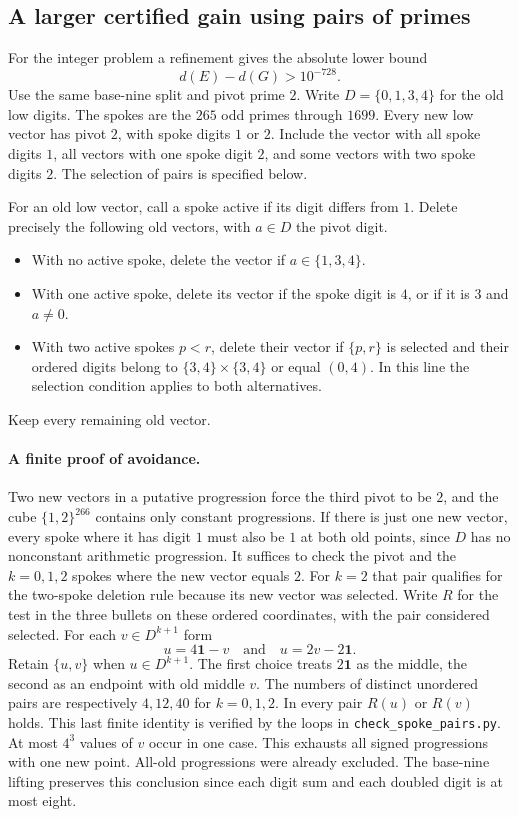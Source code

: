 \subsection*{A larger certified gain using pairs of primes}

For the integer problem a refinement gives the absolute lower bound
\[
                         d(E)-d(G)>10^{-728}.
\]
Use the same base-nine split and pivot prime $2$. Write $D=\{0,1,3,4\}$
for the old low digits. The spokes are the $265$ odd primes through
$1699$. Every new low vector has pivot $2$, with spoke digits $1$ or
$2$. Include the vector with all spoke digits $1$, all vectors with
one spoke digit $2$, and some vectors with two spoke digits $2$. The
selection of pairs is specified below.

For an old low vector, call a spoke active if its digit differs from
$1$. Delete precisely the following old vectors, with $a\in D$ the
pivot digit.
\begin{itemize}
\item With no active spoke, delete the vector if $a\in\{1,3,4\}$.
\item With one active spoke, delete its vector if the spoke digit
is $4$, or if it is $3$ and $a\ne0$.
\item With two active spokes $p<r$, delete their vector if $\{p,r\}$
is selected and their ordered digits belong to
$\{3,4\}\times\{3,4\}$ or equal $(0,4)$. In this line the selection
condition applies to both alternatives.
\end{itemize}
Keep every remaining old vector.

\paragraph{A finite proof of avoidance.}
Two new vectors in a putative progression force the third pivot to be
$2$, and the cube $\{1,2\}^{266}$ contains only constant progressions.
If there is just one new vector, every spoke where it has digit $1$ must
also be $1$ at both old points, since $D$ has no nonconstant arithmetic
progression. It suffices to check the pivot and the $k=0,1,2$ spokes
where the new vector equals $2$. For $k=2$ that pair qualifies for the
two-spoke deletion rule because its new vector was selected. Write $R$
for the test in the three bullets on these ordered coordinates, with
the pair considered selected. For each $v\in D^{k+1}$ form
\[
                  u=4\mathbf{1}-v
             \quad\text{and}\quad
                  u=2v-2\mathbf{1}.
\]
Retain $\{u,v\}$ when $u\in D^{k+1}$. The first choice treats
$2\mathbf{1}$ as the middle, the second as an endpoint with old
middle $v$. The numbers of distinct unordered pairs are respectively
$4,12,40$ for $k=0,1,2$. In every pair $R(u)$ or $R(v)$ holds.
This last finite identity is verified by the loops in
\texttt{check\_spoke\_pairs.py}. At most $4^3$ values of $v$ occur in
one case. This exhausts all signed progressions with one new point.
All-old progressions were already excluded. The base-nine lifting
preserves this conclusion since each digit sum and each doubled digit
is at most eight.

